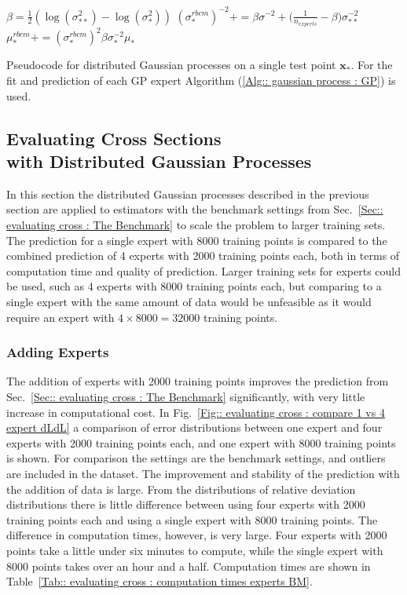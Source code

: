 \documentclass[twoside,english]{uiofysmaster}
\begin{document}
{\begin{algorithm}
{ 
$\beta = \frac{1}{2} (\log (\sigma_{**}^2) - \log (\sigma_*^2))$ \;
$(\sigma_*^{rbcm})^{-2} += \beta \sigma^{-2} + \big(\frac{1}{n_{experts}} - \beta \big) \sigma_{**}^{-2} $ 
 }  
{ 
$\mu_*^{rbcm} += (\sigma_*^{rbcm})^2 \beta \sigma^{-2}_* \mu_*$
} 
 \caption{Pseudocode for distributed Gaussian processes on a single test point $\textbf{x}_*$. For the fit and prediction of each GP expert Algorithm (\ref{Alg:: gaussian process : GP}) is used.}
\label{Alg:: gaussian process : DGP}
\end{algorithm}


\subsection{Evaluating Cross Sections\\ with Distributed Gaussian Processes}

In this section the distributed Gaussian processes described in the previous section are applied to estimators with the benchmark settings from Sec.~\ref{Sec:: evaluating cross : The Benchmark} to scale the problem to larger training sets. The prediction for a single expert with 8000 training points is compared to the combined prediction of 4 experts with 2000 training points each, both in terms of computation time and quality of prediction. Larger training sets for experts could be used, such as 4 experts with 8000 training points each, but comparing to a single expert with the same amount of data would be unfeasible as it would require an expert with $4 \times 8000 = 32 000$ training points.

\subsubsection{Adding Experts}

The addition of experts with 2000 training points improves the prediction from Sec.~\ref{Sec:: evaluating cross : The Benchmark} significantly, with very little increase in computational cost. In Fig.~\ref{Fig:: evaluating cross : compare 1 vs 4 expert dLdL} a comparison of error distributions between one expert and four experts with 2000 training points each, and one expert with 8000 training points is shown.  For comparison the settings are the benchmark settings, and outliers are included in the dataset. The improvement and stability of the prediction with the addition of data is large. From the distributions of relative deviation distributions there is little difference between using four experts with 2000 training points each and using a single expert with 8000 training points. The difference in computation times, however, is very large. Four experts with 2000 points take a little under six minutes to compute, while the single expert with 8000 points takes over an hour and a half. Computation times are shown in Table~\ref{Tab:: evaluating cross : computation times experts BM}.

}
\end{document}
